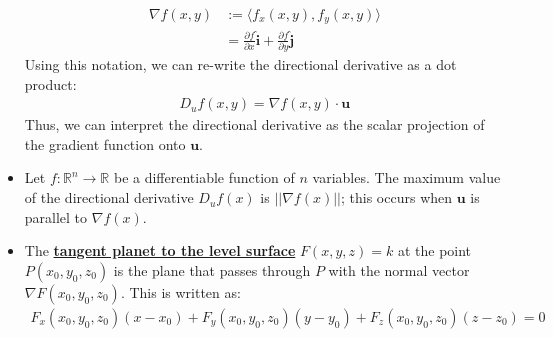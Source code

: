 \documentclass[11pt]{article}
\newcommand{\dfn}[1]{\underline{\textbf{#1}}}
\newcommand{\R}[0]{\mathbb{R}}
\begin{document}
\begin{itemize}[noitemsep]
\begin{align*}
		\nabla f(x,y) & := \langle f_x(x,y), f_y(x,y) \rangle \\
					  & = \frac{\partial f}{\partial x} \mathbf{\hat{i}} + \frac{\partial f}{\partial y} \mathbf{\hat{j}} 
	\end{align*}
	Using this notation, we can re-write the directional derivative as a dot product: 
	\begin{align*}
		D_u f(x,y) = \nabla f(x,y) \cdot \mathbf{u} 
	\end{align*}
	Thus, we can interpret the directional derivative as the scalar projection of the gradient function onto $\mathbf{u}$. 
	\item Let $f: \R^n \rightarrow \R$ be a differentiable function of $n$ variables. The maximum value of the directional derivative $D_uf(x)$ is $|| \nabla f(x) ||$; this occurs when $\mathbf{u}$ is parallel to $\nabla f(x)$. 
	\item The \dfn{tangent planet to the level surface} $F(x,y,z) = k$ at the point $P(x_0, y_0, z_0)$ is the plane that passes through $P$ with the normal vector $\nabla F(x_0, y_0, z_0)$. This is written as:
	\begin{align}
		F_x(x_0, y_0, z_0) (x-x_0) + F_y(x_0, y_0, z_0) (y-y_0) + F_z (x_0, y_0, z_0) (z-z_0) = 0 	
	\end{align}
\end{itemize}
\end{document}
